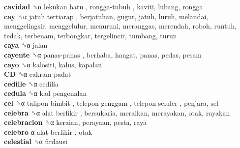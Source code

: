 \textbf{cavidad} ␝α   lekukan batu ,  rongga-tubuh , kaviti, lubang, rongga  \\
\textbf{cay} ␝α   jatuh tertiarap , berjatuhan, gugur, jatuh, luruh, melandai, menggelingsir, menggelulur, menuruni, meranggas, merendah, roboh, runtuh, tedak, terbenam, terbongkar, tergelincir, tumbang, turun  \\
\textbf{caya} ␝α  jalan  \\
\textbf{cayente} ␝α   panas-panas , berhaba, hangat, panas, pedas, pesam  \\
\textbf{cayo} ␝α  kalositi, kalus, kapalan  \\
\textbf{CD} ␝α   cakram padat   \\
\textbf{cedille} ␝α  cedilla  \\
\textbf{cedula} ␝α   kad pengenalan   \\
\textbf{cel} ␝α   talipon bimbit ,  telepon genggam ,  telepon seluler , penjara, sel  \\
\textbf{celebra} ␝α   alat berfikir , bersukaria, meraikan, merayakan, otak, rayakan  \\
\textbf{celebracion} ␝α  keraian, perayaan, pesta, raya  \\
\textbf{celebro} α   alat berfikir , otak  \\
\textbf{celestial} ␝α  firdausi  \\
